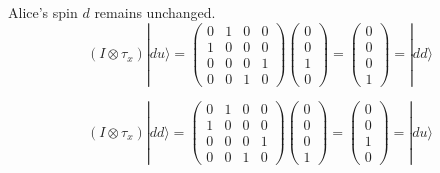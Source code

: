 Alice's spin $d$ remains unchanged.
\begin{equation*}
(I\otimes\tau_x)|du\rangle
=\begin{pmatrix}0&1&0&0\\1&0&0&0\\0&0&0&1\\0&0&1&0\end{pmatrix}
\begin{pmatrix}0\\0\\1\\0\end{pmatrix}
=\begin{pmatrix}0\\0\\0\\1\end{pmatrix}=|dd\rangle
\end{equation*}

\begin{equation*}
(I\otimes\tau_x)|dd\rangle
=\begin{pmatrix}0&1&0&0\\1&0&0&0\\0&0&0&1\\0&0&1&0\end{pmatrix}
\begin{pmatrix}0\\0\\0\\1\end{pmatrix}
=\begin{pmatrix}0\\0\\1\\0\end{pmatrix}=|du\rangle
\end{equation*}


